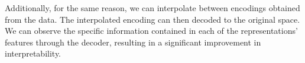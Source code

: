 	Additionally, for the same reason, we can interpolate between encodings obtained from the data. The interpolated encoding can then decoded to the original space. We can observe the specific information contained in each of the representations' features through the decoder, resulting in a significant improvement in interpretability.
	
		
		
		
	
	
	
	
	
	
	
	
	




